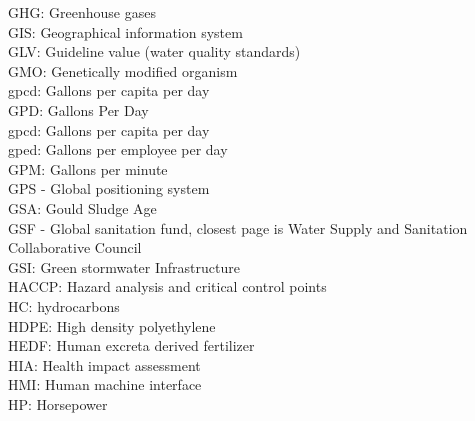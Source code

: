 \documentclass{article}
\begin{document}
GHG:  Greenhouse gases
\vspace{0.3cm}\\
GIS:  Geographical information system
\vspace{0.3cm}\\
GLV:  Guideline value (water quality standards)
\vspace{0.3cm}\\
GMO:  Genetically modified organism
\vspace{0.3cm}\\
gpcd:  Gallons per capita per day
\vspace{0.3cm}\\
GPD:  Gallons Per Day
\vspace{0.3cm}\\
gpcd:  Gallons per capita per day
\vspace{0.3cm}\\
gped:  Gallons per employee per day
\vspace{0.3cm}\\
GPM:  Gallons per minute
\vspace{0.3cm}\\
GPS - Global positioning system
\vspace{0.3cm}\\
GSA:  Gould Sludge Age
\vspace{0.3cm}\\
GSF - Global sanitation fund, closest page is Water Supply and Sanitation Collaborative Council
\vspace{0.3cm}\\
GSI:  Green stormwater Infrastructure
\vspace{0.3cm}\\
HACCP:  Hazard analysis and critical control points
\vspace{0.3cm}\\
HC:  hydrocarbons
\vspace{0.3cm}\\
HDPE:  High density polyethylene
\vspace{0.3cm}\\
HEDF:  Human excreta derived fertilizer
\vspace{0.3cm}\\
HIA:  Health impact assessment
\vspace{0.3cm}\\
HMI:  Human machine interface  
\vspace{0.3cm}\\
HP:  Horsepower
\vspace{0.3cm}\\
\end{document}
